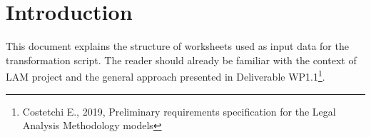 \section{Introduction}\label{ariaid-title1}

This document explains the structure of worksheets used as input data for the transformation script. The reader should already be familiar with the context of LAM project and the general approach presented in Deliverable WP1.1\footnote{Costetchi E., 2019, Preliminary requirements specification for the Legal Analysis Methodology models}.
